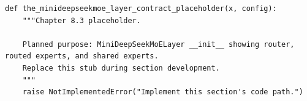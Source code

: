 \begin{lstlisting}[style=bookpython,caption={Planned code placeholder for the MiniDeepSeekMoE layer contract.},label={lst:ch08-the-minideepseekmoe-layer-contract}]
def the_minideepseekmoe_layer_contract_placeholder(x, config):
    """Chapter 8.3 placeholder.

    Planned purpose: MiniDeepSeekMoELayer __init__ showing router, routed experts, and shared experts.
    Replace this stub during section development.
    """
    raise NotImplementedError("Implement this section's code path.")
\end{lstlisting}

